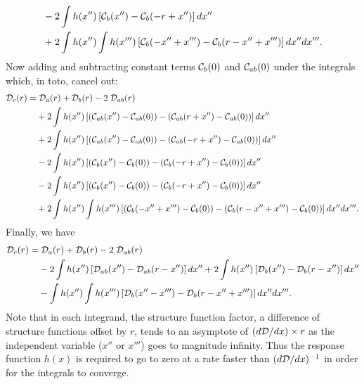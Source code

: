 \documentclass[11pt, oneside]{article}   	%
\begin{document}
\begin{appendix}
\begin{align}
                       & - 2 \int h(x'') \left[  {\cal C}_{b}(x'') - {\cal C}_b(-r+x'')\right] dx'' \nonumber \\
                       & + 2 \int h(x'') \int h(x''') \left[{\cal C}_b(-x''+x''') - {\cal C}_b(r-x''+x''')\right] dx'' dx'''.
\end{align}
Now adding and subtracting constant terms ${\cal C}_b(0)$ and ${\cal C}_{ab}(0)$ under the integrals which, in toto, cancel out:
\begin{align}
{\cal D}_c(r) =&\; {\cal D}_a(r) + {\cal D}_b (r) - 2\; {\cal D}_{a b} (r) \nonumber \\
                       & + 2 \int h(x'') \left[ ({\cal C}_{ab}(x'') - {\cal C}_{ab}(0)) - ({\cal C}_{ab}(r+x'') - {\cal C}_{ab}(0))\right] dx'' \nonumber \\
                       & + 2 \int h(x'') \left[ ({\cal C}_{ab}(x'') - {\cal C}_{ab}(0)) - ({\cal C}_{ab}(-r+x'') - {\cal C}_{ab}(0))\right] dx'' \nonumber \\
                       & - 2 \int h(x'') \left[ ({\cal C}_{b}(x'') -{\cal C}_b(0)) - ({\cal C}_b(-r+x'') - {\cal C}_b(0))\right] dx'' \nonumber \\
                       & - 2 \int h(x'') \left[ ({\cal C}_{b}(x'') -{\cal C}_b(0)) - ({\cal C}_b(-r+x'') - {\cal C}_b(0))\right] dx'' \nonumber \\
                       & + 2 \int h(x'') \int h(x''') \left[({\cal C}_b(-x''+x''') - {\cal C}_b(0)) - ({\cal C}_b(r-x''+x''')-{\cal C}_b(0))\right] dx'' dx'''.
\end{align}
Finally, we have
\begin{align}
\label{eqn:55}
{\cal D}_c(r) =&\; {\cal D}_a(r) + {\cal D}_b (r) - 2\; {\cal D}_{ab} (r) \nonumber \\
                       & - 2\int h(x'') \left[ {\cal D}_{ab}(x'') - {\cal D}_{ab}(r-x'') \right] d x''
                        + 2\int h(x'') \left[ {\cal D}_{b}(x'') - {\cal D}_{b}(r-x'') \right] d x'' \nonumber \\
                       & - \int h(x'') \int h(x''') \left[ {\cal D}_b (x''-x''') - {\cal D}_b (r - x'' + x''') \right] dx'' dx'''.
\end{align}
Note that in each integrand, the structure function factor, a difference of structure functions offset by $r$, tends to an asymptote of $(d{\cal D}/d x) \times r$ as the independent variable ($x''$ or $x'''$) goes to magnitude infinity. Thus the response function $h(x)$ is required to go to zero at a rate faster than $(d{\cal D}/d x)^{-1}$ in order for the integrals to converge.


\end{appendix}
\end{document}
